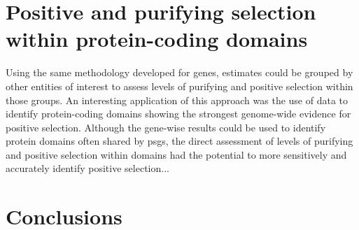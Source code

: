 \section{Positive and purifying selection within protein-coding domains}

Using the same methodology developed for genes, \sw estimates could be
grouped by other entities of interest to assess levels of purifying
and positive selection within those groups. An interesting application
of this approach was the use of \sw data to identify protein-coding
domains showing the strongest genome-wide evidence for positive
selection. Although the gene-wise results could be used to identify
protein domains often shared by \acp{psg}, the direct assessment of
levels of purifying and positive selection within domains had the
potential to more sensitively and accurately identify positive
selection...

\section{Conclusions}

